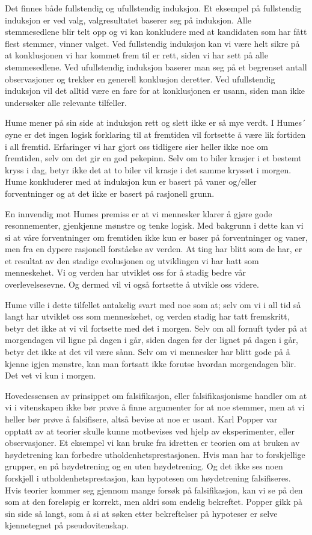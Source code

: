 \documentclass[
  letterpaper,
  DIV=11,
  numbers=noendperiod]{scrreprt}
\begin{document}
Det finnes både fullstendig og ufullstendig induksjon. Et eksempel på
fullstendig induksjon er ved valg, valgresultatet baserer seg på
induksjon. Alle stemmesedlene blir telt opp og vi kan konkludere med at
kandidaten som har fått flest stemmer, vinner valget. Ved fullstendig
induksjon kan vi være helt sikre på at konklusjonen vi har kommet frem
til er rett, siden vi har sett på alle stemmesedlene. Ved ufullstendig
induksjon baserer man seg på et begrenset antall observasjoner og
trekker en generell konklusjon deretter. Ved ufullstendig induksjon vil
det alltid være en fare for at konklusjonen er usann, siden man ikke
undersøker alle relevante tilfeller.

Hume mener på sin side at induksjon rett og slett ikke er så mye verdt.
I Humes´ øyne er det ingen logisk forklaring til at fremtiden vil
fortsette å være lik fortiden i all fremtid. Erfaringer vi har gjort oss
tidligere sier heller ikke noe om fremtiden, selv om det gir en god
pekepinn. Selv om to biler krasjer i et bestemt kryss i dag, betyr ikke
det at to biler vil krasje i det samme krysset i morgen. Hume
konkluderer med at induksjon kun er basert på vaner og/eller
forventninger og at det ikke er basert på rasjonell grunn.

En innvendig mot Humes premiss er at vi mennesker klarer å gjøre gode
resonnementer, gjenkjenne mønstre og tenke logisk. Med bakgrunn i dette
kan vi si at våre forventninger om fremtiden ikke kun er baser på
forventninger og vaner, men fra en dypere rasjonell forståelse av
verden. At ting har blitt som de har, er et resultat av den stadige
evolusjonen og utviklingen vi har hatt som menneskehet. Vi og verden har
utviklet oss for å stadig bedre vår overlevelsesevne. Og dermed vil vi
også fortsette å utvikle oss videre.

Hume ville i dette tilfellet antakelig svart med noe som at; selv om vi
i all tid så langt har utviklet oss som menneskehet, og verden stadig
har tatt fremskritt, betyr det ikke at vi vil fortsette med det i
morgen. Selv om all fornuft tyder på at morgendagen vil ligne på dagen i
går, siden dagen før der lignet på dagen i går, betyr det ikke at det
vil være sånn. Selv om vi mennesker har blitt gode på å kjenne igjen
mønstre, kan man fortsatt ikke forutse hvordan morgendagen blir. Det vet
vi kun i morgen.

Hovedessensen av prinsippet om falsifikasjon, eller falsifikasjonisme
handler om at vi i vitenskapen ikke bør prøve å finne argumenter for at
noe stemmer, men at vi heller bør prøve å falsifisere, altså bevise at
noe er usant. Karl Popper var opptatt av at teorier skulle kunne
motbevises ved hjelp av eksperimenter, eller observasjoner. Et eksempel
vi kan bruke fra idretten er teorien om at bruken av høydetrening kan
forbedre utholdenhetsprestasjonen. Hvis man har to forskjellige grupper,
en på høydetrening og en uten høydetrening. Og det ikke ses noen
forskjell i utholdenhetsprestasjon, kan hypotesen om høydetrening
falsifiseres. Hvis teorier kommer seg gjennom mange forsøk på
falsifikasjon, kan vi se på den som at den foreløpig er korrekt, men
aldri som endelig bekreftet. Popper gikk på sin side så langt, som å si
at søken etter bekreftelser på hypoteser er selve kjennetegnet på
pseudovitenskap.
\end{document}
